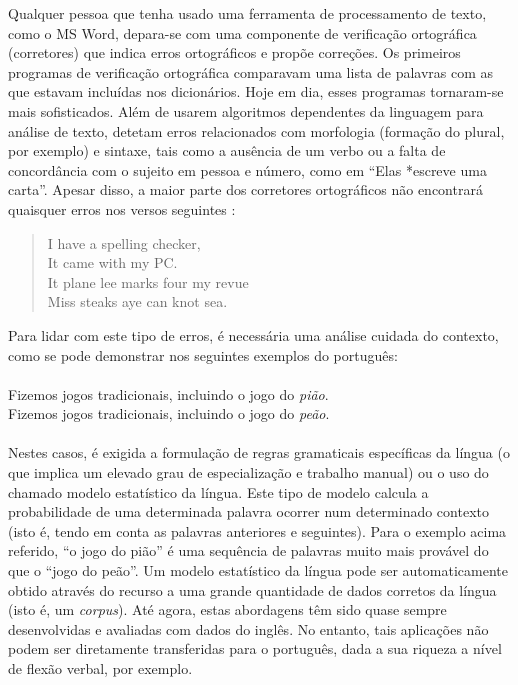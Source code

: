 \documentclass[]{../metanetpaper}
\begin{document}
\begin{multicols}{2}
Qualquer pessoa que tenha usado uma ferramenta de processamento de texto, como o MS Word, depara-se com uma componente de verificação ortográfica (corretores) que indica erros ortográficos e propõe correções. Os primeiros programas de verificação ortográfica comparavam uma lista de palavras com as que estavam incluídas nos dicionários. Hoje em dia, esses programas tornaram-se mais sofisticados. Além de usarem algoritmos dependentes da linguagem para análise de texto, detetam erros relacionados com morfologia (formação do plural, por exemplo) e sintaxe, tais como a ausência de um verbo ou a falta de concordância com o sujeito em pessoa e número, como em “Elas *escreve uma carta”. Apesar disso, a maior parte dos corretores ortográficos não encontrará quaisquer erros nos versos seguintes \cite{zar1}:

\begin{quote}
  I have a spelling checker,\\
  It came with my PC.\\
  It plane lee marks four my revue\\
  Miss steaks aye can knot sea.
\end{quote}

Para lidar com este tipo de erros, é necessária uma análise cuidada do contexto, como se pode demonstrar nos seguintes exemplos do português:\\
\\
Fizemos jogos tradicionais, incluindo o jogo do \textit{pião}.\\
Fizemos jogos tradicionais, incluindo o jogo do \textit{peão}.\\
\\
Nestes casos, é exigida a formulação de regras gramaticais específicas da língua (o que implica um elevado grau de especialização e trabalho manual) ou o uso do chamado modelo estatístico da língua. Este tipo de modelo calcula a probabilidade de uma determinada palavra ocorrer num determinado contexto (isto é, tendo em conta as palavras anteriores e seguintes). Para o exemplo acima referido, “o jogo do pião” é uma sequência de palavras muito mais provável do que o “jogo do peão”. Um mo\-de\-lo estatístico da língua pode ser automaticamente obtido através do recurso a uma grande quantidade de dados corretos da língua (isto é, um \textit{corpus}). Até agora, estas abordagens têm sido quase sempre desenvolvidas e avaliadas com dados do inglês. No entanto, tais aplicações não podem ser diretamente transferidas para o português, dada a sua riqueza a nível de flexão verbal, por exemplo.


\end{multicols}
\end{document}
